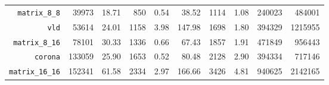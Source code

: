 {\begin{tabular}{|r|r|r|r|r|r|r|r|r|r|}
   \texttt{matrix\_8\_8}         &   39973 &   18.71 &   850 &    0.54 &   38.52 &  1114 &    1.08 & 240023 & 484001 \\
   \texttt{vld}                  &   53614 &   24.01 &  1158 &    3.98 &  147.98 &  1698 &    1.80 & 394329 & 1215955 \\
   \texttt{matrix\_8\_16}        &   78101 &   30.33 &  1336 &    0.66 &   67.43 &  1857 &    1.91 & 471849 & 956443 \\
   \texttt{corona}               &  133059 &   25.90 &  1653 &    0.52 &   80.48 &  2128 &    2.90 & 394334 & 717146 \\
   \texttt{matrix\_16\_16}       &  152341 &   61.58 &  2334 &    2.97 &  166.66 &  3426 &    4.81 & 940625 & 2142165 \\
   \hline
 \end{tabular}
 }
